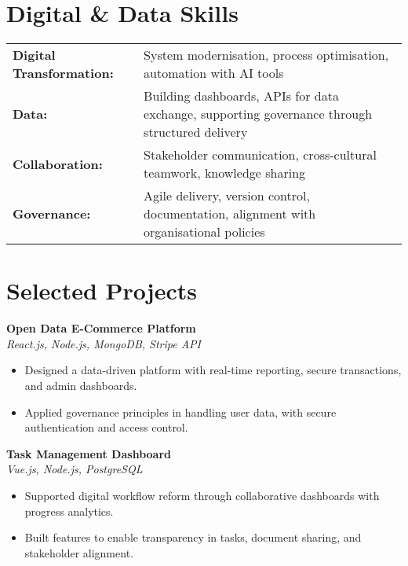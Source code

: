 \documentclass[10pt]{article}
\begin{document}
\section{Digital \& Data Skills}
\begin{tabularx}{\textwidth}{@{} l X @{}}
\textbf{Digital Transformation:} & System modernisation, process optimisation, automation with AI tools \\
\textbf{Data:} & Building dashboards, APIs for data exchange, supporting governance through structured delivery \\
\textbf{Collaboration:} & Stakeholder communication, cross-cultural teamwork, knowledge sharing \\
\textbf{Governance:} & Agile delivery, version control, documentation, alignment with organisational policies \\
\end{tabularx}

\section{Selected Projects}

\textbf{Open Data E-Commerce Platform} \\
\textit{React.js, Node.js, MongoDB, Stripe API}
\begin{itemize}
\item Designed a data-driven platform with real-time reporting, secure transactions, and admin dashboards.
\item Applied governance principles in handling user data, with secure authentication and access control.
\end{itemize}

\textbf{Task Management Dashboard} \\
\textit{Vue.js, Node.js, PostgreSQL}
\begin{itemize}
\item Supported digital workflow reform through collaborative dashboards with progress analytics.
\item Built features to enable transparency in tasks, document sharing, and stakeholder alignment.
\end{itemize}
\end{document}
